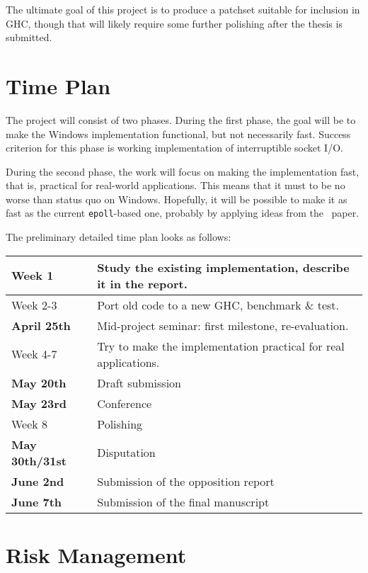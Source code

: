 \documentclass[10pt, oneside]{article}
\begin{document}
The ultimate goal of this project is to produce a patchset suitable for
inclusion in GHC, though that will likely require some further polishing after
the thesis is submitted.

\section{Time Plan}
\label{sec:time-plan}

The project will consist of two phases. During the first phase, the goal will be
to make the Windows implementation functional, but not necessarily fast. Success
criterion for this phase is working implementation of interruptible socket I/O.

During the second phase, the work will focus on making the implementation fast,
that is, practical for real-world applications. This means that it must to be no
worse than status quo on Windows. Hopefully, it will be possible to make it as
fast as the current \texttt{epoll}-based one, probably by applying ideas from
the~\cite{bib:mio} paper.

The preliminary detailed time plan looks as follows:

\begin{center}
\begin{tabular}{|l|l|}
\hline
Week 1    & Study the existing implementation, describe it in the report.\\
\hline
Week 2-3  & Port old code to a new GHC, benchmark \& test.\\
\hline
\textbf{April 25th} & Mid-project seminar: first milestone, re-evaluation.\\
\hline
Week 4-7  & Try to make the implementation practical for real applications.\\
\hline
\textbf{May 20th} & Draft submission\\
\hline
\textbf{May 23rd} & Conference\\
\hline
Week 8    & Polishing       \\
\hline
\textbf{May 30th/31st} & Disputation\\
\hline
\textbf{June 2nd} & Submission of the opposition report\\
\hline
\textbf{June 7th} & Submission of the final manuscript\\
\hline
\end{tabular}
\end{center}

\section{Risk Management}
\label{sec:risk-management}
\end{document}
